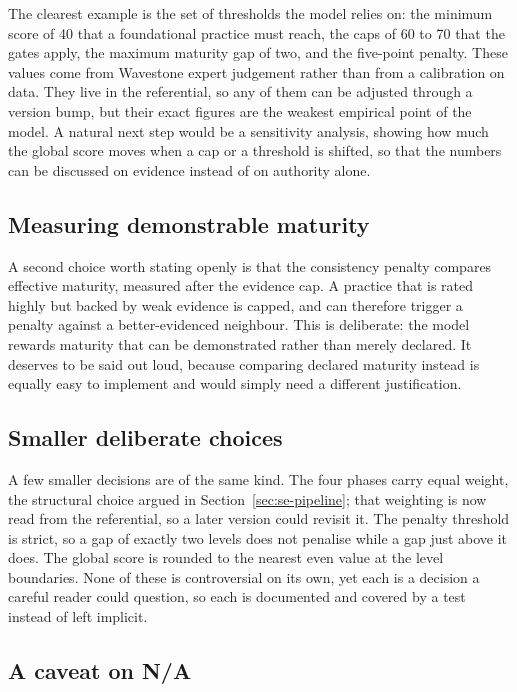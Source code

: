 The clearest example is the set of thresholds the model relies on: the minimum score
of 40 that a foundational practice must reach, the caps of 60 to 70 that the gates
apply, the maximum maturity gap of two, and the five-point penalty. These values
come from Wavestone expert judgement rather than from a calibration on data. They
live in the referential, so any of them can be adjusted through a version bump, but
their exact figures are the weakest empirical point of the model. A natural next step
would be a sensitivity analysis, showing how much the global score moves when a cap
or a threshold is shifted, so that the numbers can be discussed on evidence instead
of on authority alone.

\subsection{Measuring demonstrable maturity}

A second choice worth stating openly is that the consistency penalty compares
effective maturity, measured after the evidence cap. A practice that is rated highly
but backed by weak evidence is capped, and can therefore trigger a penalty against a
better-evidenced neighbour. This is deliberate: the model rewards maturity that can
be demonstrated rather than merely declared. It deserves to be said out loud, because
comparing declared maturity instead is equally easy to implement and would simply
need a different justification.

\subsection{Smaller deliberate choices}

A few smaller decisions are of the same kind. The four phases carry equal weight, the
structural choice argued in Section~\ref{sec:se-pipeline}; that weighting is now read
from the referential, so a later version could revisit it. The penalty threshold is strict, so a gap of exactly
two levels does not penalise while a gap just above it does. The global score is
rounded to the nearest even value at the level boundaries. None of these is
controversial on its own, yet each is a decision a careful reader could question, so
each is documented and covered by a test instead of left implicit.

\subsection{A caveat on N/A}

